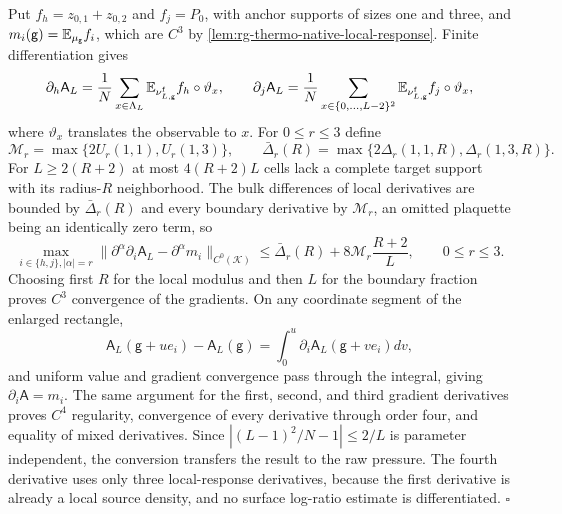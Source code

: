 Put $f_h=z_{0,1}+z_{0,2}$ and $f_j=P_0$, with anchor supports of sizes one
and three, and $m_i(\mathsf g)=\mathbb E_{\mu_{\mathsf g}}f_i$, which are $C^3$ by
\cref{lem:rg-thermo-native-local-response}. Finite differentiation gives
\begin{equation}
 \partial_h\mathsf A_L=\frac1N\sum_{x\in\Lambda_L}
                   \mathbb E_{\nu^{\mathrm f}_{L,\mathsf g}}f_h\circ\vartheta_x,
 \qquad
 \partial_j\mathsf A_L=\frac1N\sum_{x\in\{0,\ldots,L-2\}^2}
                   \mathbb E_{\nu^{\mathrm f}_{L,\mathsf g}}f_j\circ\vartheta_x,
 \label{eq:rg-thermo-native-pressure-gradient}
\end{equation}
where $\vartheta_x$ translates the observable to $x$. For $0\le r\le3$ define
\begin{equation}
 \mathcal M_r=\max\{2U_r(1,1),U_r(1,3)\},\qquad
 \bar\Delta_r(R)=\max\{2\Delta_r(1,1,R),\Delta_r(1,3,R)\}.
 \label{eq:rg-thermo-native-gradient-bounds}
\end{equation}
For $L\ge2(R+2)$ at most $4(R+2)L$ cells lack a complete target support with
its radius-$R$ neighborhood. The bulk differences of local derivatives are
bounded by $\bar\Delta_r(R)$ and every boundary derivative by $\mathcal M_r$,
an omitted plaquette being an identically zero term, so
\begin{equation}
 \max_{i\in\{h,j\},|\alpha|=r}
 \|\partial^\alpha\partial_i\mathsf A_L-
                       \partial^\alpha m_i\|_{C^0(\mathcal K)}
 \le\bar\Delta_r(R)+8\mathcal M_r\frac{R+2}{L},\qquad 0\le r\le3.
 \label{eq:rg-thermo-native-pressure-gradient-boundary}
\end{equation}
Choosing first $R$ for the local modulus and then $L$ for the boundary
fraction proves $C^3$ convergence of the gradients. On any coordinate segment
of the enlarged rectangle,
\begin{equation}
 \mathsf A_L(\mathsf g+u e_i)-\mathsf A_L(\mathsf g)
       =\int_0^u\partial_i\mathsf A_L(\mathsf g+v e_i)dv,
 \label{eq:rg-thermo-native-pressure-ftc}
\end{equation}
and uniform value and gradient convergence pass through the integral, giving
$\partial_i\mathsf A=m_i$. The same argument for the first, second, and third
gradient derivatives proves $C^4$ regularity, convergence of every derivative
through order four, and equality of mixed derivatives. Since
$|(L-1)^2/N-1|\le2/L$ is parameter independent, the conversion transfers the
result to the raw pressure. The fourth derivative uses only three
local-response derivatives, because the first derivative is already a local
source density, and no surface log-ratio estimate is differentiated. $\square$

